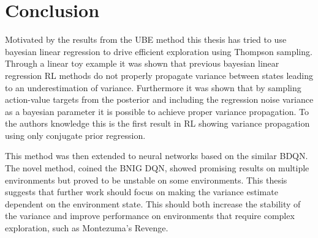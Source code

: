 
\chapter{Conclusion}\label{ch:conc}

Motivated by the results from the UBE method \citep{donoghue_2017} this thesis has tried to use bayesian linear regression to drive efficient exploration using Thompson sampling. Through a linear toy example it was shown that previous bayesian linear regression RL methods do not properly propagate variance between states leading to an underestimation of variance. Furthermore it was shown that by sampling action-value targets from the posterior and including the regression noise variance as a bayesian parameter it is possible to achieve proper variance propagation. To the authors knowledge this is the first result in RL showing variance propagation using only conjugate prior regression.

This method was then extended to neural networks based on the similar \cite{azziz_2018} BDQN. The novel method, coined the BNIG DQN, showed promising results on multiple environments but proved to be unstable on some environments. This thesis suggests that further work should focus on making the variance estimate dependent on the environment state. This should both increase the stability of the variance and improve performance on environments that require complex exploration, such as Montezuma's Revenge.

\cleardoublepage